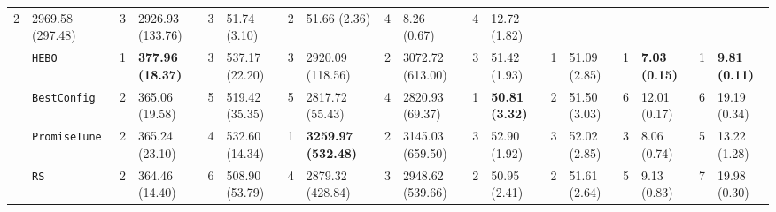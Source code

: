 \begin{tabular}{clllllllllllllllll}
  2 &
  \multicolumn{1}{l|}{2969.58 (297.48)} &
  3 &
  \multicolumn{1}{l|}{2926.93 (133.76)} &
  3 &
  \multicolumn{1}{l|}{51.74 (3.10)} &
  2 &
  \multicolumn{1}{l|}{51.66 (2.36)} &
  4 &
  \multicolumn{1}{l|}{8.26 (0.67)} &
  4 &
  12.72 (1.82) \\
\multicolumn{1}{c|}{} &
  \multicolumn{1}{l|}{\texttt{HEBO}} &
  \cellcolor{yellow!25}1 &
  \multicolumn{1}{l|}{\cellcolor{yellow!25}\textbf{377.96 (18.37)}} &
  3 &
  \multicolumn{1}{l|}{537.17 (22.20)} &
  3 &
  \multicolumn{1}{l|}{2920.09 (118.56)} &
  2 &
  \multicolumn{1}{l|}{3072.72 (613.00)} &
  3 &
  \multicolumn{1}{l|}{51.42 (1.93)} &
  \cellcolor{yellow!25}1 &
  \multicolumn{1}{l|}{\cellcolor{yellow!25}51.09 (2.85)} &
  \cellcolor{yellow!25}1 &
  \multicolumn{1}{l|}{\cellcolor{yellow!25}\textbf{7.03 (0.15)}} &
  \cellcolor{yellow!25}1 &
  \cellcolor{yellow!25}\textbf{9.81 (0.11)} \\
\multicolumn{1}{c|}{} &
  \multicolumn{1}{l|}{\texttt{BestConfig}} &
  2 &
  \multicolumn{1}{l|}{365.06 (19.58)} &
  5 &
  \multicolumn{1}{l|}{519.42 (35.35)} &
  5 &
  \multicolumn{1}{l|}{2817.72 (55.43)} &
  4 &
  \multicolumn{1}{l|}{2820.93 (69.37)} &
  \cellcolor{yellow!25}1 &
  \multicolumn{1}{l|}{\cellcolor{yellow!25}\textbf{50.81 (3.32)}} &
  2 &
  \multicolumn{1}{l|}{51.50 (3.03)} &
  6 &
  \multicolumn{1}{l|}{12.01 (0.17)} &
  6 &
  19.19 (0.34) \\
\multicolumn{1}{c|}{} &
  \multicolumn{1}{l|}{\texttt{PromiseTune}} &
  2 &
  \multicolumn{1}{l|}{365.24 (23.10)} &
  4 &
  \multicolumn{1}{l|}{532.60 (14.34)} &
  \cellcolor{yellow!25}1 &
  \multicolumn{1}{l|}{\cellcolor{yellow!25}\textbf{3259.97 (532.48)}} &
  2 &
  \multicolumn{1}{l|}{3145.03 (659.50)} &
  3 &
  \multicolumn{1}{l|}{52.90 (1.92)} &
  3 &
  \multicolumn{1}{l|}{52.02 (2.85)} &
  3 &
  \multicolumn{1}{l|}{8.06 (0.74)} &
  5 &
  13.22 (1.28) \\
\multicolumn{1}{c|}{} &
  \multicolumn{1}{l|}{\texttt{RS}} &
  2 &
  \multicolumn{1}{l|}{364.46 (14.40)} &
  6 &
  \multicolumn{1}{l|}{508.90 (53.79)} &
  4 &
  \multicolumn{1}{l|}{2879.32 (428.84)} &
  3 &
  \multicolumn{1}{l|}{2948.62 (539.66)} &
  2 &
  \multicolumn{1}{l|}{50.95 (2.41)} &
  2 &
  \multicolumn{1}{l|}{51.61 (2.64)} &
  5 &
  \multicolumn{1}{l|}{9.13 (0.83)} &
  7 &
  19.98 (0.30) \\
\hline
\end{tabular}